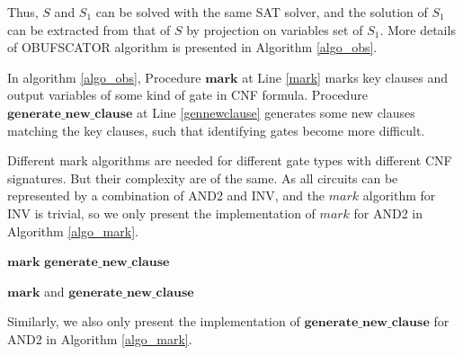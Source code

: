 \documentclass[runningheads,a4paper]{llncs}
\begin{document}
Thus,
$S$ and $S_1$ can be solved with the same SAT solver,
and the solution of $S_1$ can be extracted from that of $S$ by projection on variables set of $S_1$.
More details of OBUFSCATOR algorithm is presented in Algorithm \ref{algo_obs}.

In algorithm \ref{algo_obs}, 
Procedure $\mathbf{mark}$ at Line \ref{mark} marks key clauses and output variables of some kind of gate in CNF formula.
Procedure $\mathbf{generate\_new\_clause}$ at Line \ref {gennewclause} generates some new clauses matching the key clauses, 
such that identifying gates become more difficult.

Different mark algorithms are needed for different gate types with different CNF signatures.
But their complexity are of the same. 
As all circuits can be represented by a combination of AND2 and INV,
and the $mark$ algorithm for INV is trivial,
so we only present the implementation of $mark$ for AND2 in Algorithm \ref{algo_mark}.

\begin{algorithm}[t]
$\mathbf{mark}$\;
$\mathbf{generate\_new\_clause}$\;
\caption{$\mathbf{mark}$ and $\mathbf{generate\_new\_clause}$}
\label{algo_mark}
\end{algorithm}


Similarly,
we also only present the implementation of $\mathbf{generate\_new\_clause}$ for AND2 in Algorithm \ref{algo_mark}.


% 
\end{document}
